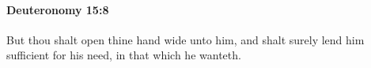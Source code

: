 
		\paragraph{Deuteronomy 15:8} %
			\label{DEUTERONOMY-15-8}

			But thou shalt open thine hand wide unto him, and shalt surely lend him sufficient for his need, in that which he wanteth.


